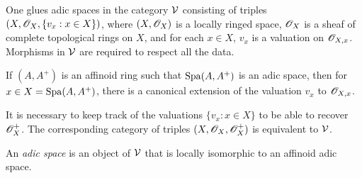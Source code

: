 \documentclass{article}
\begin{document}
One glues adic spaces in the category $\mathcal{V}$ consisting of triples 
$(X,\mathscr{O}_X,\{v_x:x\in X\})$, where $(X,\mathscr{O}_X)$ is a locally ringed space, 
$\mathscr{O}_X$ is a sheaf of complete topological rings on $X$, and for each 
$x\in X$, $v_x$ is a valuation on $\mathscr{O}_{X,x}$. Morphisms in $\mathcal{V}$ are required 
to respect all the data. 

If $(A,A^+)$ is an affinoid ring such that $\operatorname{Spa}(A,A^+)$ is an adic space, 
then for $x\in X=\operatorname{Spa}(A,A^+)$, there is a canonical extension of the valuation 
$v_x$ to $\mathscr{O}_{X,x}$. 

It is necessary to keep track of the valuations $\{v_x:x\in X\}$ to be able to 
recover $\mathscr{O}_X^+$. The corresponding category of triples $(X,\mathscr{O}_X,\mathscr{O}_X^+)$ 
is equivalent to $\mathcal{V}$. 

\begin{definition}
An \emph{adic space} is an object of $\mathcal{V}$ that is locally isomorphic to an 
affinoid adic space. 
\end{definition}
\end{document}
